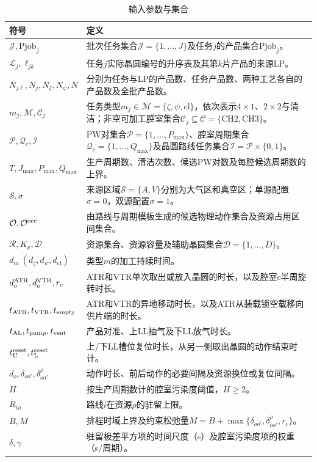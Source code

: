 \documentclass[preprint,12pt,nonatbib]{elsarticle}
\begin{document}
\begin{table}[!htbp]
\centering\small
\caption{输入参数与集合}
\label{tab:symbol-cn-a}
\renewcommand{\arraystretch}{1.03}
\setlength{\tabcolsep}{4pt}
\begin{tabular}{@{}C{0.20\textwidth}C{\textwidth-8pt\relax}@{}}
\toprule
符号 & 定义\\\midrule
$\mathcal J,\mathrm{Pjob}_j$ & 批次任务集合$\mathcal J=\{1,\ldots,J\}$及任务$j$的产品集合$\mathrm{Pjob}_j$。\\
$\mathcal L_j,\ell_{jk}$ & 任务$j$实际晶圆编号的升序表及其第$k$片产品的来源LP。\\
$N_{j\ell},N_j,N_\zeta,N_\psi,N$ & 分别为任务与LP的产品数、任务产品数、两种工艺各自的产品数及全批产品数。\\
$m_j,\mathcal M,\mathcal C_j$ & 任务类型$m_j\in\mathcal M=\{\zeta,\psi,\mathrm{cl}\}$，依次表示$4\times1$、$2\times2$与清洁；非空可加工腔室集合$\mathcal C_j\subseteq\mathcal C=\{\mathrm{CH2},\mathrm{CH3}\}$。\\
$\mathcal P,\mathcal Q_c,\mathcal I$ & PW对集合$\mathcal P=\{1,\ldots,P_{\max}\}$、腔室周期集合$\mathcal Q_c=\{1,\ldots,Q_{\max}\}$及晶圆路线任务集合$\mathcal I=\mathcal P\times\{0,1\}$。\\
$T,J_{\max},P_{\max},Q_{\max}$ & 生产周期数、清洁次数、候选PW对数及每腔候选周期数的上界。\\
$\mathcal S,\sigma$ & 来源区域$\mathcal S=\{A,V\}$分别为大气区和真空区；单源配置$\sigma=0$，双源配置$\sigma=1$。\\
$\mathcal O,\mathcal O^{\rm occ}$ & 由路线与周期模板生成的候选物理动作集合及资源占用区间集合。\\
$\mathcal R,K_\rho,\mathcal D$ & 资源集合、资源容量及辅助晶圆集合$\mathcal D=\{1,\ldots,D\}$。\\
$d_m\ (d_\zeta,d_\psi,d_{\mathrm{cl}})$ & 类型$m$的加工持续时间。\\
$d_o^{\rm ATR},d_o^{\rm VTR},r_c$ & ATR和VTR单次取出或放入晶圆的时长，以及腔室$c$半周旋转时长。\\
$t_{\rm ATR},t_{\rm VTR},t_{\rm empty}$ & ATR和VTR的异地移动时长，以及ATR从装载锁空载移向供片端的时长。\\
$t_{\rm AL},t_{\rm pump},t_{\rm vent}$ & 产品对准、上LL抽气及下LL放气时长。\\
$t_{\rm U}^{\rm reset},t_{\rm L}^{\rm reset}$ & 上/下LL槽位复位时长，从另一侧取出晶圆的动作结束时计。\\
$d_o,\delta_{oo'},\delta^\rho_{oo'}$ & 动作时长、前后动作的必要间隔及资源换位或复位间隔。\\
$H$ & 按生产周期数计的腔室污染度阈值，$H\ge2$。\\
$\overline R_{i\rho}$ & 路线$i$在资源$\rho$的驻留上限。\\
$B,M$ & 排程时域上界及约束松弛量$M=B+\max\{\delta_{oo'},\delta^\rho_{oo'},r_c\}$。\\
$\delta,\gamma$ & 驻留极差平方项的时间尺度（s）及腔室污染度项的权重（s/周期）。\\
\bottomrule
\end{tabular}
\end{table}
\end{document}
